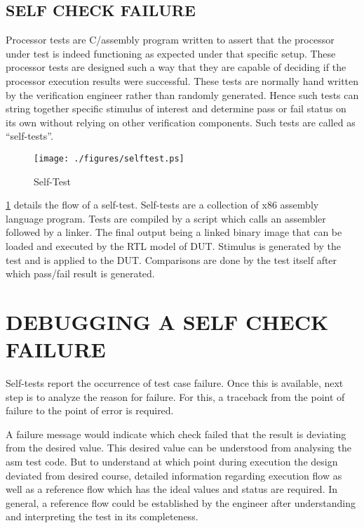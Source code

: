 \subsection {SELF CHECK FAILURE}

Processor tests are C/assembly program written to assert that the processor under test is indeed functioning as expected under that specific setup. These processor tests are designed such a way that they are capable of deciding if the processor execution results were successful. These tests are normally hand written by the verification engineer rather than randomly generated.  Hence such tests can string together specific stimulus of interest and determine pass or fail status on its own without relying on other verification components. Such tests are called as ``self-tests''.


\begin{figure}[h]
\centering
\texttt{[image: ./figures/selftest.ps]}
\caption{Self-Test} 
\label{fig:selftest.ps}
\end{figure}

\figurename {\ref{fig:selftest.ps}} details the flow of a self-test. Self-tests are a collection of x86 assembly language program. Tests are compiled by a script which calls an assembler followed by a linker. The final output being a linked binary image that can be loaded and executed by the RTL model of DUT. Stimulus is generated by the test and is applied to the DUT. Comparisons are done by the test itself after which pass/fail result is generated.



\section{DEBUGGING A SELF CHECK FAILURE}

Self-tests report the occurrence of test case failure. Once this is available, next step is to analyze the reason for failure.  For this, a traceback from the point of failure to the point of error is required. 

A failure message would indicate which check failed that the result is deviating from the desired value. This desired value can be understood from analysing the asm test code. But to understand at which point during execution the design deviated from desired course, detailed information regarding execution flow as well as a reference flow which has the ideal values and status are required. In general, a reference flow could be established by the engineer after understanding and interpreting the test in its completeness.
 
